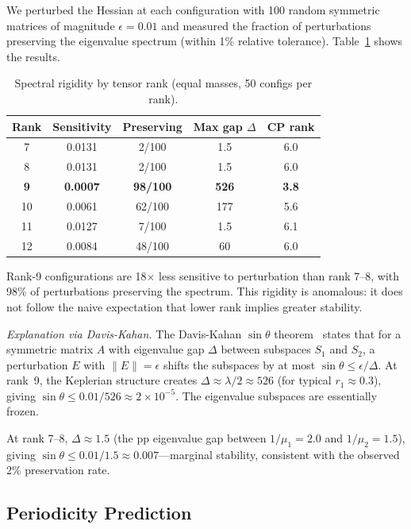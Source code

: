 \documentclass[aps,pre,twocolumn,superscriptaddress,floatfix]{revtex4-2}
\begin{document}
We perturbed the Hessian at each configuration with 100 random
symmetric matrices of magnitude $\epsilon = 0.01$ and measured
the fraction of perturbations preserving the eigenvalue spectrum
(within 1\% relative tolerance). Table~\ref{tab:rigidity} shows the results.

\begin{table}[h]
\caption{Spectral rigidity by tensor rank (equal masses, 50 configs per rank).}
\label{tab:rigidity}
\begin{ruledtabular}
\begin{tabular}{ccccc}
Rank & Sensitivity & Preserving & Max gap $\Delta$ & CP rank \\
\hline
7 & 0.0131 & 2/100 & 1.5 & 6.0 \\
8 & 0.0131 & 2/100 & 1.5 & 6.0 \\
\textbf{9} & \textbf{0.0007} & \textbf{98/100} & \textbf{526} & \textbf{3.8} \\
10 & 0.0061 & 62/100 & 177 & 5.6 \\
11 & 0.0127 & 7/100 & 1.5 & 6.1 \\
12 & 0.0084 & 48/100 & 60 & 6.0 \\
\end{tabular}
\end{ruledtabular}
\end{table}

Rank-9 configurations are 18$\times$ less sensitive to perturbation
than rank 7--8, with 98\% of perturbations preserving the spectrum.
This rigidity is anomalous: it does not follow the naive expectation
that lower rank implies greater stability.

\emph{Explanation via Davis-Kahan.} The Davis-Kahan $\sin\theta$
theorem~\cite{daviskahan1970} states that for a symmetric matrix $A$
with eigenvalue gap $\Delta$ between subspaces $S_1$ and $S_2$, a
perturbation $E$ with $\|E\| = \epsilon$ shifts the subspaces by at
most $\sin\theta \leq \epsilon / \Delta$. At rank~9, the Keplerian
structure creates $\Delta \approx \lambda/2 \approx 526$ (for
typical $r_1 \approx 0.3$), giving
$\sin\theta \leq 0.01 / 526 \approx 2 \times 10^{-5}$.
The eigenvalue subspaces are essentially frozen.

At rank 7--8, $\Delta \approx 1.5$ (the pp eigenvalue gap between
$1/\mu_1 = 2.0$ and $1/\mu_2 = 1.5$), giving
$\sin\theta \leq 0.01 / 1.5 \approx 0.007$---marginal stability,
consistent with the observed 2\% preservation rate.

\subsection{Periodicity Prediction}
\end{document}

